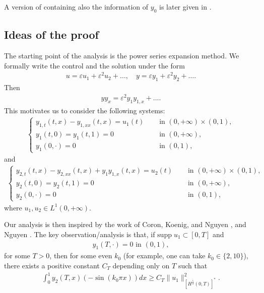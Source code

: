 \documentclass[11pt, reqno]{amsart}
\newcommand{\eps}{\varepsilon}
\theoremstyle{plain}
\numberwithin{equation}{section}
\begin{document}
A  version of  containing also the information of $y_0$ is later given in . 


\subsection{Ideas of the proof}
 The starting point of the analysis is the power series expansion method. We formally write the control and the solution under the form 
\begin{align*}
     u = \eps u_1 + \eps^2 u_2 + \ldots, \quad y  = \eps y_1 + \eps^2 y_2 + \ldots. 
 \end{align*}
 Then 
\begin{align*}
    y y_x = \eps^2 y_{1} y_{1, x} + \ldots.
\end{align*}
This motivates us to consider the following systems: 
\begin{align}   
    \label{our1storder-***}
    \begin{cases}   
        y_{1, t} (t, x) - y_{1, xx} (t, x) = u_1(t) \quad &\text{ in } (0, +\infty) \times (0, 1), \\[6pt]
        y_{1}(t, 0) = y_{1}(t, 1) = 0 &\text{ in } (0, +\infty),\\[6pt]
        y_1(0, \cdot) = 0 &\text{ in } (0, 1),
    \end{cases}
\end{align}
and
\begin{align}   
    \label{our2ndorder-***}
    \begin{cases}   
        y_{2, t} (t, x) -y_{2, xx} (t, x) + y_1 y_{1, x} (t, x) = u_2(t) \quad &\text{ in } (0, +\infty) \times (0, 1), \\[6pt]
        y_{2}(t, 0) = y_{2}(t, 1) = 0 &\text{ in } (0, +\infty), \\[6pt]
        y_2(0, \cdot) = 0 &\text{ in } (0, 1),
    \end{cases}
\end{align}  
where $u_1, u_2 \in L^1(0, +\infty)$. 

Our analysis is then inspired by the work of Coron, Koenig, and Nguyen \cite{Coron-Koenig-Nguyen}, and Nguyen \cite{Nguyen}. The key observation/analysis is that, if $\mathrm{supp} \; u_1 \subset [0, T]$ and
\begin{align}	\label{y10->0}
y_1(T, \cdot ) = 0 \mbox{ in } (0, 1),
\end{align} 
for some $T>0$, then for some even $k_0$ (for example, one can take $k_0 \in \{2, 10\}$), there exists a positive constant $C_T$ depending only on $T$ such that 
\begin{align}	\label{our-obstruct}
\int_0^1 y_2(T, x) \left(-\sin(k_0 \pi x) \right) dx  \geq  C_T \| u_1 \|_{[H^{\frac{5}{4}}(0, T)]^*}^2. 
\end{align}
\end{document}

